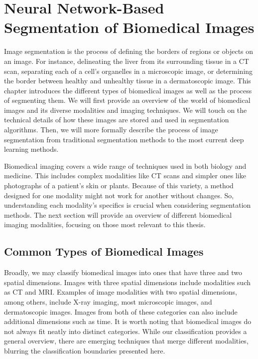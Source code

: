 \chapter{Neural Network-Based Segmentation of Biomedical Images}
\label{chap:seg-background}

Image segmentation is the process of defining the borders of regions or objects on an image. For instance, delineating the liver from its surrounding tissue in a CT scan, separating each of a cell's organelles in a microscopic image, or determining the border between healthy and unhealthy tissue in a dermatoscopic image. This chapter introduces the different types of biomedical images as well as the process of segmenting them. We will first provide an overview of the world of biomedical images and its diverse modalities and imaging techniques. We will touch on the technical details of how these images are stored and used in segmentation algorithms. Then, we will more formally describe the process of image segmentation from traditional segmentation methods to the most current deep learning methods.

Biomedical imaging covers a wide range of techniques used in both biology and medicine. This includes complex modalities like CT scans and simpler ones like photographs of a patient's skin or plants. Because of this variety, a method designed for one modality might not work for another without changes. So, understanding each modality's specifics is crucial when considering segmentation methods. The next section will provide an overview of different biomedical imaging modalities, focusing on those most relevant to this thesis.

\section{Common Types of Biomedical Images}

Broadly, we may classify biomedical images into ones that have three and two spatial dimensions. Images with three spatial dimensions include modalities such as CT and MRI. Examples of image modalities with two spatial dimensions, among others, include X-ray imaging, most microscopic images, and dermatoscopic images. Images from both of these categories can also include additional dimensions such as time. It is worth noting that biomedical images do not always fit neatly into distinct categories. While our classification provides a general overview, there are emerging techniques that merge different modalities, blurring the classification boundaries presented here.

